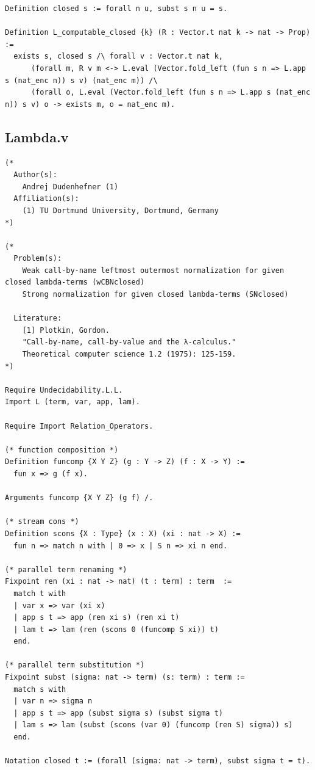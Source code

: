 \begin{lstlisting}
Definition closed s := forall n u, subst s n u = s.

Definition L_computable_closed {k} (R : Vector.t nat k -> nat -> Prop) := 
  exists s, closed s /\ forall v : Vector.t nat k, 
      (forall m, R v m <-> L.eval (Vector.fold_left (fun s n => L.app s (nat_enc n)) s v) (nat_enc m)) /\
      (forall o, L.eval (Vector.fold_left (fun s n => L.app s (nat_enc n)) s v) o -> exists m, o = nat_enc m).

\end{lstlisting}

\subsection*{Lambda.v}
\begin{lstlisting}
(*
  Author(s):
    Andrej Dudenhefner (1)
  Affiliation(s):
    (1) TU Dortmund University, Dortmund, Germany
*)

(*
  Problem(s):
    Weak call-by-name leftmost outermost normalization for given closed lambda-terms (wCBNclosed)
    Strong normalization for given closed lambda-terms (SNclosed)

  Literature:
    [1] Plotkin, Gordon.
    "Call-by-name, call-by-value and the λ-calculus."
    Theoretical computer science 1.2 (1975): 125-159.
*)

Require Undecidability.L.L.
Import L (term, var, app, lam).

Require Import Relation_Operators.

(* function composition *)
Definition funcomp {X Y Z} (g : Y -> Z) (f : X -> Y) :=
  fun x => g (f x).

Arguments funcomp {X Y Z} (g f) /.

(* stream cons *)
Definition scons {X : Type} (x : X) (xi : nat -> X) :=
  fun n => match n with | 0 => x | S n => xi n end.

(* parallel term renaming *)
Fixpoint ren (xi : nat -> nat) (t : term) : term  :=
  match t with
  | var x => var (xi x)
  | app s t => app (ren xi s) (ren xi t)
  | lam t => lam (ren (scons 0 (funcomp S xi)) t)
  end.

(* parallel term substitution *)
Fixpoint subst (sigma: nat -> term) (s: term) : term :=
  match s with
  | var n => sigma n
  | app s t => app (subst sigma s) (subst sigma t)
  | lam s => lam (subst (scons (var 0) (funcomp (ren S) sigma)) s)
  end.

Notation closed t := (forall (sigma: nat -> term), subst sigma t = t).


\end{lstlisting}
